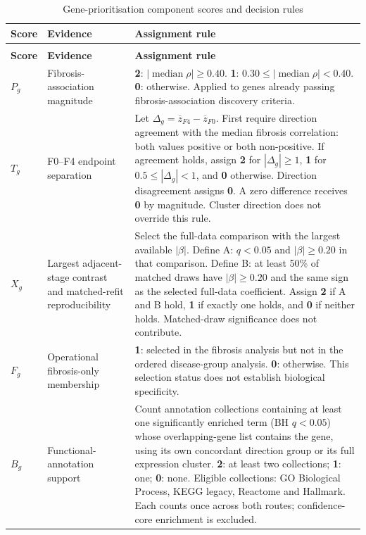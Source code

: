 \clearpage
\begingroup
\renewcommand{\thetable}{S\arabic{table}}
\renewcommand{\theHtable}{S\arabic{table}}
\setcounter{table}{2}
\fontsize{9}{11}\selectfont
\setlength{\tabcolsep}{4pt}
\renewcommand{\arraystretch}{1.15}
\begin{longtable}{>{\raggedright\arraybackslash}p{}>{\raggedright\arraybackslash}p{}>{\raggedright\arraybackslash}p{}}
\caption{Gene-prioritisation component scores and decision rules}\label{tab:S3}\\
\toprule
\textbf{Score} & \textbf{Evidence} & \textbf{Assignment rule} \\
\midrule\endfirsthead
\multicolumn{3}{l}{\textbf{Table S3 continued}}\\
\toprule
\textbf{Score} & \textbf{Evidence} & \textbf{Assignment rule} \\
\midrule\endhead
\bottomrule\endfoot
$P_g$ & Fibrosis-association magnitude & \textbf{2}: $|\operatorname{median}\rho|\geq0.40$. \textbf{1}: $0.30\leq|\operatorname{median}\rho|<0.40$. \textbf{0}: otherwise. Applied to genes already passing fibrosis-association discovery criteria. \\
$T_g$ & F0--F4 endpoint separation & Let $\Delta_g=\overline{z}_{F4}-\overline{z}_{F0}$. First require direction agreement with the median fibrosis correlation: both values positive or both non-positive. If agreement holds, assign \textbf{2} for $|\Delta_g|\geq1$, \textbf{1} for $0.5\leq|\Delta_g|<1$, and \textbf{0} otherwise. Direction disagreement assigns \textbf{0}. A zero difference receives \textbf{0} by magnitude. Cluster direction does not override this rule. \\
$X_g$ & Largest adjacent-stage contrast and matched-refit reproducibility & Select the full-data comparison with the largest available $|\beta|$. Define A: $q<0.05$ and $|\beta|\geq0.20$ in that comparison. Define B: at least 50\% of matched draws have $|\beta|\geq0.20$ and the same sign as the selected full-data coefficient. Assign \textbf{2} if A and B hold, \textbf{1} if exactly one holds, and \textbf{0} if neither holds. Matched-draw significance does not contribute. \\
$F_g$ & Operational fibrosis-only membership & \textbf{1}: selected in the fibrosis analysis but not in the ordered disease-group analysis. \textbf{0}: otherwise. This selection status does not establish biological specificity. \\
$B_g$ & Functional-annotation support & Count annotation collections containing at least one significantly enriched term (BH $q<0.05$) whose overlapping-gene list contains the gene, using its own concordant direction group or its full expression cluster. \textbf{2}: at least two collections; \textbf{1}: one; \textbf{0}: none. Eligible collections: GO Biological Process, KEGG legacy, Reactome and Hallmark. Each counts once across both routes; confidence-core enrichment is excluded. \\
\end{longtable}
